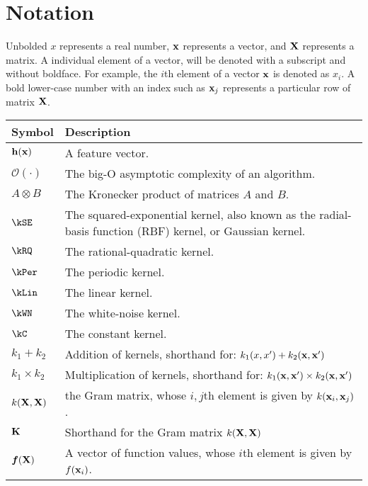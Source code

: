 
\inbpdocument

\chapter*{Notation}
\label{ch:notation}


Unbolded $x$ represents a real number, ${\bf{x}}$ represents a vector, and $\mathbf{X}$ represents a matrix.
A individual element of a vector, will be denoted with a subscript and without boldface.
For example, the $i$th element of a vector ${\bf{x}}$ is denoted as $x_i$.
A bold lower-case number with an index such as ${\bf{x}}_j$ represents a particular row of matrix $\mathbf{X}$.

\vspace{1cm}

\begin{tabular}{lm{12cm}}
Symbol \quad     & Description \\
\hline
${\bf{h}}({\bf{x}})$       & A feature vector. \\
$\mathcal{O}(\cdot)$ & The big-O asymptotic complexity of an algorithm. \\
$A \otimes B$ & The Kronecker product of matrices $A$ and $B$. \\
$\kSE$ & The squared-exponential kernel, also known as the radial-basis function (RBF) kernel, or Gaussian kernel. \\
$\kRQ$ & The rational-quadratic kernel. \\
$\kPer$ & The periodic kernel. \\
$\kLin$ & The linear kernel. \\
$\kWN$ & The white-noise kernel. \\
$\kC$ & The constant kernel. \\
$k_1 + k_2$ & Addition of kernels, shorthand for: $k_1(x,x') + k_2({\bf{x}}, {\bf{x}}')$ \\
$k_1 \times k_2$& Multiplication of kernels, shorthand for: $k_1({\bf{x}}, {\bf{x}}') \times k_2({\bf{x}}, {\bf{x}}')$ \\
$k(\mathbf{X}, \mathbf{X})$ & the Gram matrix, whose $i,j$th element is given by $k({\bf{x}}_i, {\bf{x}}_j)$. \\
$\mathbf{K}$ & Shorthand for the Gram matrix $k(\mathbf{X}, \mathbf{X})$ \\
$\boldsymbol{f}(\mathbf{X})$ & A vector of function values, whose $i$th element is given by $f({\bf{x}}_i)$.
\end{tabular}



\outbpdocument{
}


